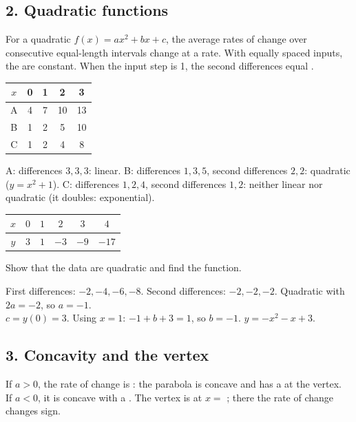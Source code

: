 \subsection*{2. Quadratic functions}
\begin{keyidea}
For a quadratic $f(x)=ax^2+bx+c$, the average rates of change over consecutive equal-length intervals change at a  rate. With equally spaced inputs, the  are constant. When the input step is 1, the second differences equal .
\end{keyidea}

\begin{center}\begin{tabular}{c|cccc}$x$&0&1&2&3\\\hline A&4&7&10&13\\ B&1&2&5&10\\ C&1&2&4&8\end{tabular}\end{center}
\begin{workspace}[2.8cm]
A: differences $3,3,3$: linear. \quad B: differences $1,3,5$, second differences $2,2$: quadratic ($y=x^2+1$). \quad C: differences $1,2,4$, second differences $1,2$: neither linear nor quadratic (it doubles: exponential).
\end{workspace}

\begin{center}\begin{tabular}{c|ccccc}$x$&$0$&$1$&$2$&$3$&$4$\\\hline$y$&$3$&$1$&$-3$&$-9$&$-17$\end{tabular}\end{center}
Show that the data are quadratic and find the function.
\begin{workspace}[3.6cm]
First differences: $-2,-4,-6,-8$. Second differences: $-2,-2,-2$. Quadratic with $2a=-2$, so $a=-1$.\\
$c=y(0)=3$. Using $x=1$: $-1+b+3=1$, so $b=-1$. \quad $y=-x^2-x+3$.
\end{workspace}

\subsection*{3. Concavity and the vertex}
\begin{keyidea}
If $a>0$, the rate of change is : the parabola is concave  and has a  at the vertex.\\
If $a<0$, it is concave  with a . The vertex is at $x=$ ; there the rate of change changes sign.
\end{keyidea}

